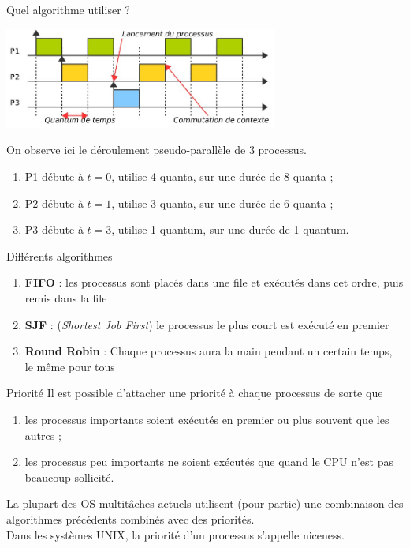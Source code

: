 \documentclass[10pt]{beamer}
\begin{document}
\begin{frame}{Quel algorithme utiliser ?}
\begin{center}
\includegraphics[width=9cm]{img/3proc}
\end{center}\pause
On observe ici le déroulement \alert{pseudo-parallèle} de 3 processus.\pause
\begin{enumerate}[--]
	\item P1 débute à $t=0$, utilise 4 quanta, sur une durée de 8 quanta ;\pause
    \item P2 débute à $t=1$, utilise 3 quanta, sur une durée de 6 quanta ;\pause
    \item P3 débute à $t=3$, utilise 1 quantum, sur une durée de 1 quantum.
\end{enumerate}
\end{frame}
\begin{frame}{Différents algorithmes}

\begin{enumerate}[--]\pause
	\item \textbf{FIFO} : les processus sont placés dans une file et exécutés dans cet ordre, puis remis dans la file\pause
    \item \textbf{SJF} : (\textit{Shortest Job First}) le processus le plus court est exécuté en premier\pause
    \item \textbf{Round Robin} : Chaque processus aura la main pendant un certain temps, le même pour tous
\end{enumerate}
\end{frame}
\begin{frame}{Priorité}\pause
Il est possible d'attacher une priorité à chaque processus de sorte que\pause
\begin{enumerate}[--]
	\item les processus importants soient exécutés en premier ou plus souvent que les autres ;\pause
    \item les processus peu importants ne soient exécutés que quand le CPU n'est pas beaucoup sollicité.\pause
\end{enumerate}

La plupart des OS multitâches actuels utilisent (pour partie) une combinaison des algorithmes précédents combinés avec des priorités.\\\pause
Dans les systèmes \textsc{UNIX}, la priorité d'un processus s'appelle \alert{niceness}.
\end{frame}
\end{document}
